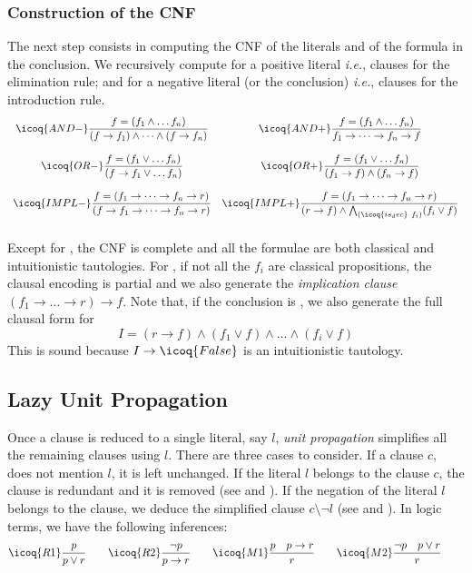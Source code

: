\documentclass[utf8,a4paper,UKenglish,cleveref, autoref, thm-restate]{lipics-v2019}
\begin{document}
\subsubsection{Construction of the CNF}
The next step consists in computing the CNF of the literals and of the
formula in the conclusion.  We recursively compute for a positive literal
 \emph{i.e.}, clauses for the elimination rule; and for a
negative literal (or the conclusion)  \emph{i.e.}, clauses
for the introduction rule.
\[
  \begin{array}{cc}
  \icoq{AND-} \dfrac{ f = (f_1 \land \dots f_n) }
  { (f \to f_1) \land \dots \land (f \to f_n) } &
    \icoq{AND+} \dfrac{ f = (f_1 \land \dots f_n) }
    { f_1 \to \dots \to f_n \to f } \\\\
    \icoq{OR-}  \dfrac{ f = (f_1 \lor \dots f_n) }
    { (f \to f_1 \lor \dots f_n) } &
    \icoq{OR+}  \dfrac{ f = (f_1 \lor \dots f_n) }
    { (f_1 \to  f) \land  (f_n \to f) }\\\\
    \icoq{IMPL-}  \dfrac{ f = (f_1 \to \dots \to f_n \to r) }
                   { (f \to f_1 \to \dots \to f_n \to r) } &
    \icoq{IMPL+}  \dfrac{ f = (f_1 \to \dots \to f_n \to r) }
                   { (r \to f) \land \bigwedge_{(\icoq{is_dec}\ f_i)} (f_i \lor f)   }\\\\
  \end{array}
\]
Except for , the CNF is complete and all the formulae are
both classical and intuitionistic tautologies.
%
For , if not all the $f_i$ are classical propositions, the
clausal encoding is partial and we also generate the \emph{implication
  clause} $(f_1 \to \dots \to r) \to f$. Note that, if the conclusion
is , we also generate the full clausal form for 
\[
  I = (r \to f) \land (f_1 \lor f) \land \dots \land (f_i \lor f)
\]
This is sound because $I \to \icoq{False}$ is an intuitionistic tautology.%

\subsection{Lazy Unit Propagation}

Once a clause is reduced to a single literal, say $l$, \emph{unit
  propagation} simplifies all the remaining clauses using $l$. There
are three cases to consider.  If a clause $c$, does not mention $l$,
it is left unchanged. If the literal $l$ belongs to the clause $c$,
the clause is redundant and it is removed (see  and
). If the negation of the literal $l$ belongs to the clause,
we deduce the simplified clause $c \setminus \neg l$ (see  and ). In logic terms,
we have the following inferences:
\[
  \icoq{R1}\dfrac{ p }{ p \lor r } \qquad
  \icoq{R2}\dfrac {\neg p }{ p \to r } \qquad 
  \icoq{M1}\dfrac{p \quad p \to r}
  { r }  \qquad
  \icoq{M2}\dfrac{\neg p \quad p \lor r}{r} 
  \qquad
\]
\end{document}
